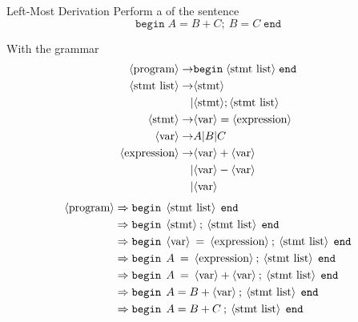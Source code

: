 \begin{example}[]{Left-Most Derivation}
  Perform a  of the sentence
  \begin{equation*}
    \mathtt{begin} \; A = B + C ; \: B = C \; \mathtt{end}
  \end{equation*}

  With the grammar
  \begin{align*}
    \langle \text{program} \rangle \rightarrow &\mathtt{begin} \; \langle \text{stmt list} \rangle \; \mathtt{end} \\
    \langle \text{stmt list} \rangle \rightarrow &\langle \text{stmt} \rangle \\
                          \vert &\langle \text{stmt} \rangle ; \langle \text{stmt list} \rangle \\
    \langle \text{stmt} \rangle \rightarrow &\langle \text{var} \rangle = \langle \text{expression} \rangle \\
    \langle \text{var} \rangle \rightarrow &A \vert B \vert C \\
    \langle \text{expression} \rangle \rightarrow &\langle \text{var} \rangle + \langle \text{var} \rangle \\
                          \vert &\langle \text{var} \rangle - \langle \text{var} \rangle \\
                          \vert &\langle \text{var} \rangle
  \end{align*}
  \tcblower{}
  \begin{align*}
    \Nonterminal{program} &\Rightarrow \mathtt{begin} \:\: \Nonterminal{stmt list} \:\: \mathtt{end} \\
                          &\Rightarrow \mathtt{begin} \:\: \Nonterminal{stmt}\: ; \: \Nonterminal{stmt list} \:\: \mathtt{end} \\
                          &\Rightarrow \mathtt{begin} \:\: \Nonterminal{var} \: = \: \Nonterminal{expression}\: ; \: \Nonterminal{stmt list} \:\: \mathtt{end} \\
                          &\Rightarrow \mathtt{begin} \:\: A \: = \: \Nonterminal{expression}\: ; \: \Nonterminal{stmt list} \:\: \mathtt{end} \\
                          &\Rightarrow \mathtt{begin} \:\: A \: = \: \Nonterminal{var} + \Nonterminal{var}\: ; \: \Nonterminal{stmt list} \:\: \mathtt{end} \\
                          &\Rightarrow \mathtt{begin} \:\: A = B + \Nonterminal{var}\: ; \: \Nonterminal{stmt list} \:\: \mathtt{end} \\
                          &\Rightarrow \mathtt{begin} \:\: A = B + C\: ; \: \Nonterminal{stmt list} \:\: \mathtt{end} \\

\end{align*}
\end{example}
